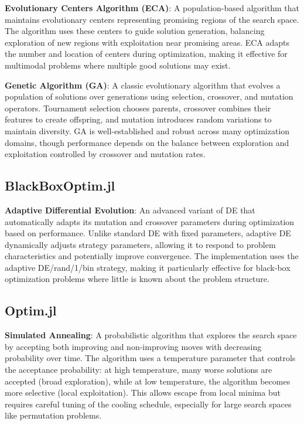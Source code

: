 \documentclass[11pt,a4paper]{article}
\begin{document}
\noindent \textbf{Evolutionary Centers Algorithm (ECA)}: A population-based algorithm that maintains evolutionary centers representing promising regions of the search space. The algorithm uses these centers to guide solution generation, balancing exploration of new regions with exploitation near promising areas. ECA adapts the number and location of centers during optimization, making it effective for multimodal problems where multiple good solutions may exist. \newline

\noindent \textbf{Genetic Algorithm (GA)}: A classic evolutionary algorithm that evolves a population of solutions over generations using selection, crossover, and mutation operators. Tournament selection chooses parents, crossover combines their features to create offspring, and mutation introduces random variations to maintain diversity. GA is well-established and robust across many optimization domains, though performance depends on the balance between exploration and exploitation controlled by crossover and mutation rates. \newline

\subsection{BlackBoxOptim.jl}

\textbf{Adaptive Differential Evolution}: An advanced variant of DE that automatically adapts its mutation and crossover parameters during optimization based on performance. Unlike standard DE with fixed parameters, adaptive DE dynamically adjusts strategy parameters, allowing it to respond to problem characteristics and potentially improve convergence. The implementation uses the adaptive DE/rand/1/bin strategy, making it particularly effective for black-box optimization problems where little is known about the problem structure.

\subsection{Optim.jl}

\textbf{Simulated Annealing}: A probabilistic algorithm that explores the search space by accepting both improving and non-improving moves with decreasing probability over time. The algorithm uses a temperature parameter that controls the acceptance probability: at high temperature, many worse solutions are accepted (broad exploration), while at low temperature, the algorithm becomes more selective (local exploitation). This allows escape from local minima but requires careful tuning of the cooling schedule, especially for large search spaces like permutation problems.
\end{document}
